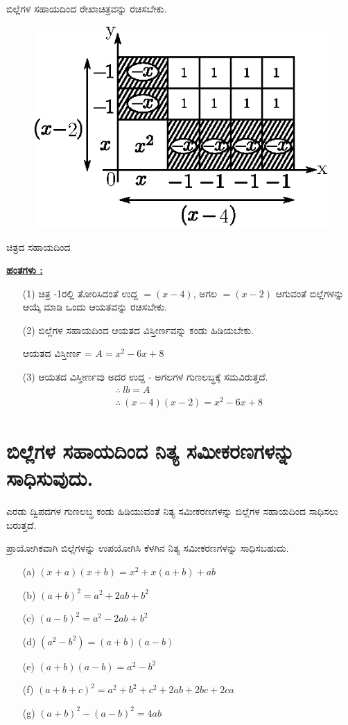 ಬಿಲ್ಲೆಗಳ ಸಹಾಯದಿಂದ ರೇಖಾಚಿತ್ರವನ್ನು ರಚಿಸಬೇಕು.
\begin{figure}[H]
\centering
\includegraphics[scale=0.8]{src/figure/chap3/fig3-31d.eps}
\end{figure}
ಚಿತ್ರದ ಸಹಾಯದಿಂದ

\noindent
{\textbf{\underline{ಹಂತಗಳು :}}}
\begin{itemize}
\item [(1)] ಚಿತ್ರ -1ರಲ್ಲಿ ತೋರಿಸಿದಂತೆ ಉದ್ದ $= (x-4)$, ಅಗಲ $= (x-2)$ ಆಗುವಂತೆ ಬಿಲ್ಲೆಗಳನ್ನು  ಆಯ್ಕೆ ಮಾಡಿ ಒಂದು ಆಯತವನ್ನು ರಚಿಸಬೇಕು. 
\item [(2)] ಬಿಲ್ಲೆಗಳ ಸಹಾಯದಿಂದ ಆಯತದ ವಿಸ್ತೀರ್ಣವನ್ನು ಕಂಡು ಹಿಡಿಯಬೇಕು. 

ಆಯತದ ವಿಸ್ತೀರ್ಣ = $A = x^2 - 6x + 8$
\item [(3)] ಆಯತದ ವಿಸ್ತೀರ್ಣವು ಅದರ ಉದ್ದ - ಅಗಲಗಳ ಗುಣಲಬ್ಧಕ್ಕೆ ಸಮವಿರುತ್ತದೆ. 
\begin{gather*}
\therefore~ lb = A\\
\therefore~ (x-4)(x-2) = x^2 - 6x + 8
\end{gather*}
\end{itemize}

\section*{ಬಿಲ್ಲೆಗಳ ಸಹಾಯದಿಂದ ನಿತ್ಯ ಸಮೀಕರಣಗಳನ್ನು ಸಾಧಿಸುವುದು.}

ಎರಡು ದ್ವಿಪದಗಳ ಗುಣಲಬ್ಧ ಕಂಡು ಹಿಡಿಯುವಂತೆ ನಿತ್ಯ ಸಮೀಕರಣಗಳನ್ನು ಬಿಲ್ಲೆಗಳ ಸಹಾಯದಿಂದ ಸಾಧಿಸಲು ಬರುತ್ತದೆ.

ಪ್ರಾಯೋಗಿಕವಾಗಿ ಬಿಲ್ಲೆಗಳನ್ನು ಉಪಯೋಗಿಸಿ ಕೆಳಗಿನ ನಿತ್ಯ ಸಮೀಕರಣಗಳನ್ನು ಸಾಧಿಸಬಹುದು. 
\begin{itemize}
\item [(a)] $(x+a)(x+b) = x^2 + x(a+b) + ab$
\item [(b)] $(a+b)^2 = a^2 + 2ab + b^2$
\item [(c)] $(a - b)^2 = a^2 - 2ab + b^2$
\item [(d)] $(a^2 - b^2) = (a+b)(a-b)$
\item [(e)] $(a+b)(a-b) = a^2 - b^2$
\item [(f)] $(a + b + c)^2 = a^2 + b^2 + c^2 + 2ab + 2bc + 2ca$
\item [(g)] $(a + b)^2 - (a - b)^2 = 4ab$
\end{itemize}


